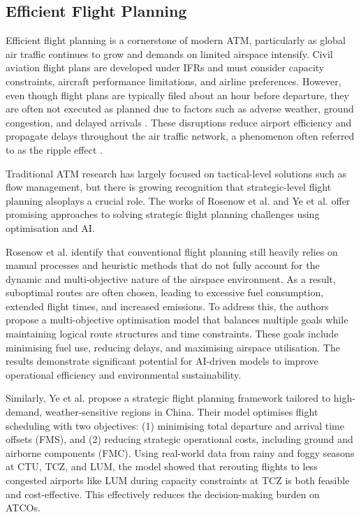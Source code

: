 \subsection{Efficient Flight Planning}

Efficient flight planning is a cornerstone of modern \gls{ATM}, particularly as global air traffic continues to grow and demands on limited airspace intensify.
Civil aviation flight plans are developed under \glspl{IFR} and must consider capacity constraints, aircraft performance limitations, and airline preferences.
However, even though flight plans are typically filed about an hour before departure, they are often not executed as planned due to factors such as adverse weather, ground congestion, and delayed arrivals  \cite{Rosenow_2021}.
These disruptions reduce airport efficiency and propagate delays throughout the air traffic network, a phenomenon often referred to as the ripple effect \cite{Ye_2024}.

Traditional \gls{ATM} research has largely focused on tactical-level solutions such as flow management, but there is growing recognition that strategic-level flight planning alsoplays a crucial role.
The works of Rosenow et al. \cite{Rosenow_2021} and Ye et al. \cite{Ye_2024} offer promising approaches to solving strategic flight planning challenges using optimisation and \gls{AI}.

Rosenow et al. \cite{Rosenow_2021} identify that conventional flight planning still heavily relies on manual processes and heuristic methods that do not fully account for the dynamic and multi-objective nature of the airspace environment.
As a result, suboptimal routes are often chosen, leading to excessive fuel consumption, extended flight times, and increased emissions.
To address this, the authors propose a multi-objective optimisation model that balances multiple goals while maintaining logical route structures and time constraints.
These goals include minimising fuel use, reducing delays, and maximising airspace utilisation.
The results demonstrate significant potential for \gls{AI}-driven models to improve operational efficiency and environmental sustainability.

Similarly, Ye et al. \cite{Ye_2024} propose a strategic flight planning framework tailored to high-demand, weather-sensitive regions in China.
Their model optimises flight scheduling with two objectives: (1) minimising total departure and arrival time offsets (\gls{FMS}), and (2) reducing strategic operational costs, including ground and airborne components (\gls{FMC}).
Using real-world data from rainy and foggy seasons at \gls{CTU}, \gls{TCZ}, and \gls{LUM}, the model showed that rerouting flights to less congested airports like \gls{LUM} during capacity constraints at \gls{TCZ} is both feasible and cost-effective.
This effectively reduces the decision-making burden on \glspl{ATCO}.

